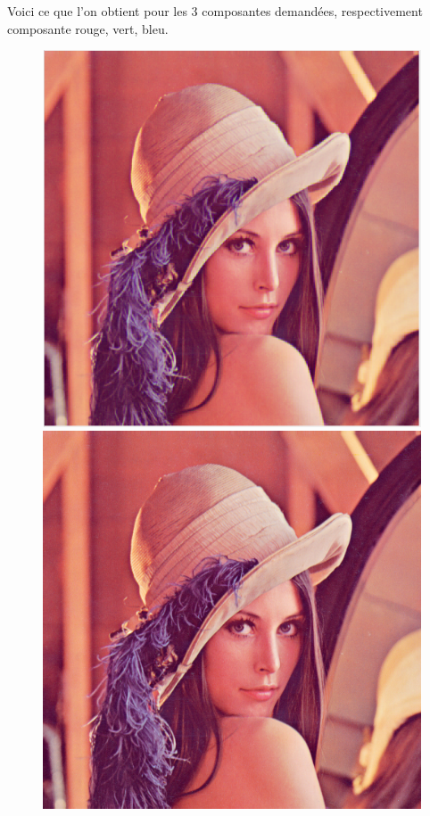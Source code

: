 \documentclass[a4paper,12pt]{report}
\begin{document}
\noindent Voici ce que l'on obtient pour les 3 composantes demandées, respectivement composante rouge, vert, bleu.

\begin{figure}[!ht]
	\center
	\includegraphics[scale=0.6]{image/p334.png}
	\includegraphics[scale=0.5]{../ti-semaine-3-lena.png}
\end{figure}
\end{document}
